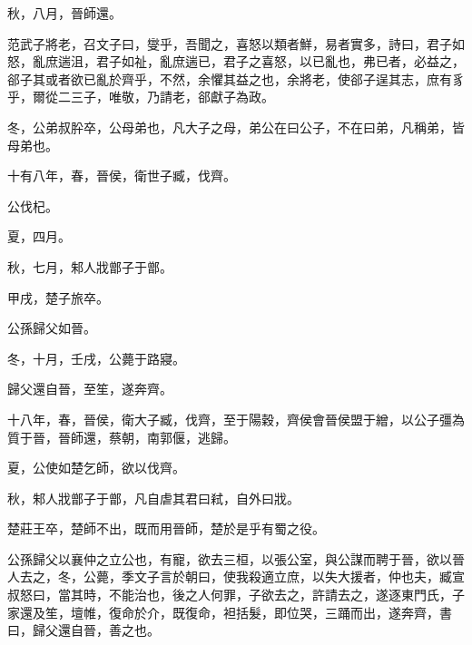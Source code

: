 \begin{pinyinscope}
秋，八月，晉師還。

范武子將老，召文子曰，燮乎，吾聞之，喜怒以類者鮮，易者實多，詩曰，君子如怒，亂庶遄沮，君子如祉，亂庶遄已，君子之喜怒，以已亂也，弗已者，必益之，郤子其或者欲已亂於齊乎，不然，余懼其益之也，余將老，使郤子逞其志，庶有豸乎，爾從二三子，唯敬，乃請老，郤獻子為政。

冬，公弟叔肸卒，公母弟也，凡大子之母，弟公在曰公子，不在曰弟，凡稱弟，皆母弟也。

十有八年，春，晉侯，衛世子臧，伐齊。

公伐杞。

夏，四月。

秋，七月，邾人戕鄫子于鄫。

甲戌，楚子旅卒。

公孫歸父如晉。

冬，十月，壬戌，公薨于路寢。

歸父還自晉，至笙，遂奔齊。

十八年，春，晉侯，衛大子臧，伐齊，至于陽穀，齊侯會晉侯盟于繒，以公子彊為質于晉，晉師還，蔡朝，南郭偃，逃歸。

夏，公使如楚乞師，欲以伐齊。

秋，邾人戕鄫子于鄫，凡自虐其君曰弒，自外曰戕。

楚莊王卒，楚師不出，既而用晉師，楚於是乎有蜀之役。

公孫歸父以襄仲之立公也，有寵，欲去三桓，以張公室，與公謀而聘于晉，欲以晉人去之，冬，公薨，季文子言於朝曰，使我殺適立庶，以失大援者，仲也夫，臧宣叔怒曰，當其時，不能治也，後之人何罪，子欲去之，許請去之，遂逐東門氏，子家還及笙，壇帷，復命於介，既復命，袒括髮，即位哭，三踊而出，遂奔齊，書曰，歸父還自晉，善之也。


\end{pinyinscope}